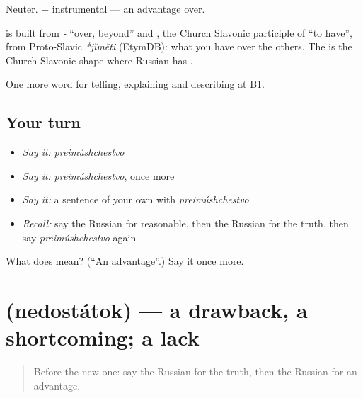 Neuter. \emph{ } + instrumental — an advantage over.

\begin{cousinweb}
\textbf{} is built from \emph{-} \textquotedblleft{}over, beyond\textquotedblright{} and \emph{}, the Church Slavonic participle of \emph{} \textquotedblleft{}to have\textquotedblright{}, from Proto-Slavic \emph{*jĭměti} (EtymDB): what you have over the others. The \emph{} is the Church Slavonic shape where Russian has \emph{}.
\end{cousinweb}

\begin{grammarlens}[title={What you've built}]
One more word for telling, explaining and describing at B1.
\end{grammarlens}

\subsection*{Your turn}
\begin{itemize}
\raggedright
  \item \emph{Say it:} \emph{preimúshchestvo}
  \item \emph{Say it:} \emph{preimúshchestvo}, once more
  \item \emph{Say it:} a sentence of your own with \emph{preimúshchestvo}
  \item \emph{Recall:} say the Russian for reasonable, then the Russian for the truth, then say \emph{preimúshchestvo} again
\end{itemize}

\begin{tcolorbox}[breakable,colback=teal!4,colframe=teal!35!black,title={Before you move on}]
What does  mean? (\textquotedblleft{}An advantage\textquotedblright{}.) Say it once more.
\end{tcolorbox}
\section[\texorpdfstring{\ru{недостаток} (nedostátok)}{недостаток (nedostátok)}]{ (nedostátok) — a drawback, a shortcoming; a lack}

\label{lesson:RU-C346-nedostatok}



\begin{quote}
Before the new one: say the Russian for the truth, then the Russian for an advantage.
\end{quote}

